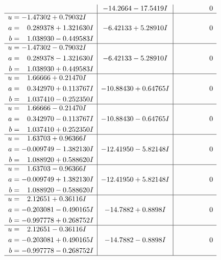 \documentclass[1p]{elsarticle_modified}
\theoremstyle{definition}
\begin{document}
$$\begin{array}{c|c|c}
 & -14.2664 - 17.5419 I & \phantom{-0.000000 } 0 \\ \hline\begin{aligned}
u &= -1.47302 + 0.79032 I \\
a &= \phantom{-}0.289378 + 1.321630 I \\
b &= \phantom{-}1.038930 - 0.449583 I\end{aligned}
 & -6.42133 + 5.28910 I & \phantom{-0.000000 } 0 \\ \hline\begin{aligned}
u &= -1.47302 - 0.79032 I \\
a &= \phantom{-}0.289378 - 1.321630 I \\
b &= \phantom{-}1.038930 + 0.449583 I\end{aligned}
 & -6.42133 - 5.28910 I & \phantom{-0.000000 } 0 \\ \hline\begin{aligned}
u &= \phantom{-}1.66666 + 0.21470 I \\
a &= \phantom{-}0.342970 + 0.113767 I \\
b &= \phantom{-}1.037410 - 0.252350 I\end{aligned}
 & -10.88430 + 0.64765 I & \phantom{-0.000000 } 0 \\ \hline\begin{aligned}
u &= \phantom{-}1.66666 - 0.21470 I \\
a &= \phantom{-}0.342970 - 0.113767 I \\
b &= \phantom{-}1.037410 + 0.252350 I\end{aligned}
 & -10.88430 - 0.64765 I & \phantom{-0.000000 } 0 \\ \hline\begin{aligned}
u &= \phantom{-}1.63703 + 0.96366 I \\
a &= -0.009749 - 1.382130 I \\
b &= \phantom{-}1.088920 + 0.588620 I\end{aligned}
 & -12.41950 - 5.82148 I & \phantom{-0.000000 } 0 \\ \hline\begin{aligned}
u &= \phantom{-}1.63703 - 0.96366 I \\
a &= -0.009749 + 1.382130 I \\
b &= \phantom{-}1.088920 - 0.588620 I\end{aligned}
 & -12.41950 + 5.82148 I & \phantom{-0.000000 } 0 \\ \hline\begin{aligned}
u &= \phantom{-}2.12651 + 0.36116 I \\
a &= -0.203081 - 0.490165 I \\
b &= -0.997778 + 0.268752 I\end{aligned}
 & -14.7882 + 0.8898 I & \phantom{-0.000000 } 0 \\ \hline\begin{aligned}
u &= \phantom{-}2.12651 - 0.36116 I \\
a &= -0.203081 + 0.490165 I \\
b &= -0.997778 - 0.268752 I\end{aligned}
 & -14.7882 - 0.8898 I & \phantom{-0.000000 } 0\\
 \hline 
 \end{array}$$\newpage\newpage\renewcommand{\arraystretch}{1}
\end{document}
